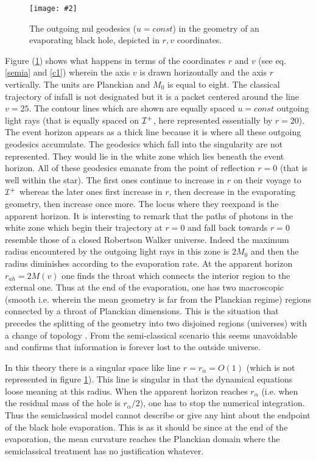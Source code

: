 \documentclass[12pt,oneside]{report}
\newcommand{\dessin}[4]
{\begin{figure}[tp]\begin{center}
\texttt{[image: \#2]}%
\end{center}
\caption{#4}
\label{#3}
\end{figure}}
\begin{document}
\dessin{1.000}{NFIG3-8.eps}{PP3}{The outgoing nul geodesics ($u=const$) in the geometry of an
evaporating black hole, depicted in $r,v$ coordinates.}
Figure (\ref{PP3}) shows what happens in terms of the coordinates $r$ and $v$
(see eq. \ref{semia} and \ref{c1}) wherein the axis 
$v$ is drawn horizontally and
the axis $r$ vertically. The units are Planckian and $M_0$ is equal to eight.
The classical trajectory of infall is not designated but it is a packet
centered around the line $v=25$. The contour lines which are shown are
equally spaced $u=const$ outgoing light rays (that is equally spaced on
${\cal I}^+$, here represented essentially by $r=20$).
The event horizon appears as a thick line because it is where all these
outgoing geodesics accumulate. The geodesics which fall into the singularity
are not represented. They would lie in the white zone which lies beneath the
event horizon. All of these geodesics emanate from the point of reflection
$r=0$ (that is well within the star). The first ones continue to increase in
$r$ on their voyage to ${\cal I}^+$ whereas the later ones first increase in
$r$, then decrease in the evaporating geometry, then increase once more. 
The locus where they reexpand 
is the apparent horizon.
It is interesting to remark that
the paths of  photons in the white zone which begin their trajectory at $r=0$
and fall back towards $r=0$ resemble those of a closed Robertson Walker universe.
Indeed the maximum radius encountered by the outgoing light rays in this zone
is $2M_0$ and then the
radius diminishes according to the evaporation rate. At the apparent horizon
$r_{ah}=2M(v)$
one finds the throat which connects the interior region
to the external one. 
Thus at the
end of the evaporation, one has two macroscopic (smooth i.e.
wherein the mean geometry is
far from the Planckian regime) regions connected by
a throat of Planckian dimensions. This
is the situation that precedes the splitting of the geometry
into two
disjoined regions (universes) with a change of
topology \cite{HawkL}. From the semi-classical
scenario this seems unavoidable and confirms that information is
forever lost to the outside universe. 

In this theory there is a singular space like line $r=r_\alpha=O(1)$ (which is
not represented in figure \ref{PP3}). This line is singular in that  
the dynamical equations loose meaning at this radius. When the apparent horizon
reaches $r_{\alpha}$ (i.e. when the residual 
mass of the hole is $r_{\alpha}/2$),
 one has to stop the numerical integration. 
Thus the semiclassical model cannot
  describe or give any hint about the endpoint of the black hole evaporation.
This  is as it should be since at the end of the evaporation, 
the mean curvature reaches the Planckian
domain where the semiclassical treatment has no justification whatever.
\end{document}

